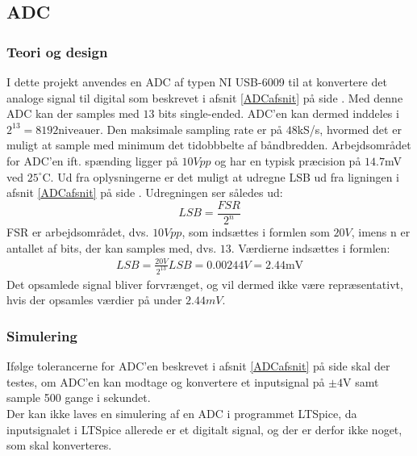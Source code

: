 \subsection{ADC}
\subsubsection{Teori og design}
I dette projekt anvendes en ADC af typen NI USB-6009 til at konvertere det analoge signal til digital som beskrevet i afsnit \ref{ADCafsnit} på side \pageref{ADCafsnit}. %
Med denne ADC kan der samples med $13$ bits single-ended. ADC'en kan dermed inddeles i $2^{13} = 8192 \text{niveauer}$. Den maksimale sampling rate er på $48$kS/s, hvormed det er muligt at sample med minimum det tidobbbelte af båndbredden. Arbejdsområdet for ADC'en ift. spænding ligger på $10Vpp$ og har en typisk præcision på $14.7$mV ved $25^{\circ}$C. \cite{Instruments2014} Ud fra oplysningerne er det muligt at udregne LSB ud fra ligningen i afsnit \ref{ADCafsnit} på side \pageref{ADCafsnit}. Udregningen ser således ud: \\
\begin{equation}
	LSB = \frac{FSR}{2^{n}} 
\end{equation}  
FSR er arbejdsområdet, dvs. $10Vpp$, som indsættes i formlen som $20V$, imens n er antallet af bits, der kan samples med, dvs. $13$.
Værdierne indsættes i formlen: \\
\begin{align}
	LSB = \frac{20V}{2^{13}}
	LSB = 0.00244V = 2.44\text{mV}
\end{align}
Det opsamlede signal bliver forvrænget, og vil dermed ikke være repræsentativt, hvis der opsamles værdier på under $2.44mV$.\\
\subsubsection{Simulering}
Ifølge tolerancerne for ADC'en beskrevet i afsnit \ref{ADCafsnit} på side \pageref{ADCafsnit} skal der testes, om ADC'en kan modtage og konvertere et inputsignal på $\pm4$V samt sample 500 gange i sekundet. \\
Der kan ikke laves en simulering af en ADC i programmet LTSpice, da inputsignalet i LTSpice allerede er et digitalt signal, og der er derfor ikke noget, som skal konverteres.
 
